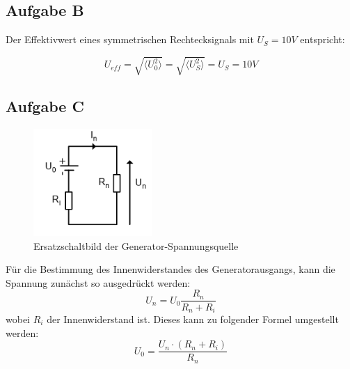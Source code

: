 \documentclass{article}
\begin{document}
\subsection*{Aufgabe B}
Der Effektivwert eines symmetrischen Rechtecksignals mit $U_S= 10 V$ entspricht:

\begin{equation}
    U_{eff}= \sqrt{\langle U_0 ^2 \rangle}= \sqrt{\langle U_S ^2 \rangle}= U_S = 10V
\end{equation}

\subsection*{Aufgabe C}

\begin{figure}[H]
    \centering
    \includegraphics[width=0.4\textwidth]{figs/Versuch0_Ersatzbild.png}
    \caption{Ersatzschaltbild der Generator-Spannungsquelle\cite{anleitung}}
    \label{fig:Ersatzbild}
\end{figure}

Für die Bestimmung des Innenwiderstandes des Generatorausgangs, kann die Spannung zunächst so ausgedrückt werden:
\begin{equation}
\label{Gl 1}
    U_n = U_0 \frac{R_n}{R_n + R_i}
\end{equation}
wobei $R_i$ der Innenwiderstand ist. Dieses kann zu folgender Formel umgestellt werden: 
\begin{equation*}
    U_0 = \frac{U_n \cdot (R_n +R_i)}{R_n}
\end{equation*}
\end{document}
